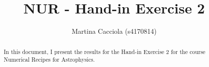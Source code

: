\documentclass[a4paper,10pt]{article}
\title{NUR - Hand-in Exercise 2}
\author{Martina Cacciola (s4170814)}
\begin{document}
\maketitle

\begin{abstract}
 In this document, I present the results for the Hand-in Exercise 2 for the 
 course Numerical Recipes for Astrophysics.
\end{abstract}



\end{document}
